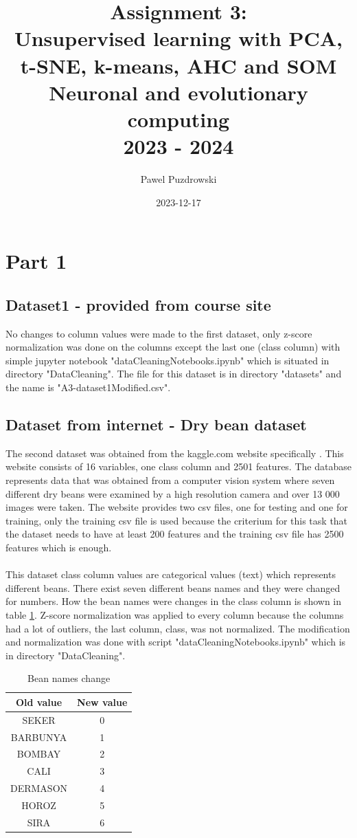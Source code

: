 \documentclass[12pt]{report}
\title{Assignment 3: \\ Unsupervised learning with
	PCA, t-SNE, k-means, AHC and SOM\\ Neuronal and evolutionary computing\\ 2023 - 2024}
\author{Pawel Puzdrowski}
\date{2023-12-17}
\begin{document}
	\maketitle
	\section*{Part 1}
	\subsection*{Dataset1 - provided from course site}
	No changes to column values were made to the first dataset, only z-score normalization was done on the columns except the last one (class column) with simple jupyter notebook "dataCleaningNotebooks.ipynb" which is situated in directory "DataCleaning". The file for this dataset is in directory "datasets" and the name is "A3-dataset1Modified.csv". 
	\subsection*{Dataset from internet - Dry bean dataset}
	The second dataset was obtained from the kaggle.com website specifically \cite{DatasetDryBeans}. This website consists of 16 variables, one class column and 2501 features. The database represents data that was obtained from a computer vision system where seven different dry beans were examined by a high resolution camera and over 13 000 images were taken. The website provides two csv files, one for testing and one for training, only the training csv file is used because the criterium for this task that the dataset needs to have at least 200 features and the training csv file has 2500 features which is enough. \\
	\\
	This dataset class column values are categorical values (text) which represents different beans. There exist seven different beans names and they were changed for numbers. How the bean names were changes in the class column is shown in table \ref{BeanClassChange}. Z-score normalization was applied to every column because the columns had a lot of outliers, the last column, class, was not normalized. The modification and normalization was done with script "dataCleaningNotebooks.ipynb" which is in directory "DataCleaning". 
	\begin{table}[H]
		\centering
		\begin{tabular}{|c|c|}
			\hline
			Old value & New value  \\
			\hline
			SEKER & 0 \\
			\hline
			BARBUNYA & 1 \\
			\hline
			BOMBAY & 2 \\
			\hline
			CALI & 3 \\
			\hline
			DERMASON & 4 \\
			\hline
			HOROZ & 5 \\
			\hline
			SIRA & 6 \\
			\hline
		\end{tabular}
		\caption{Bean names change}
		\label{BeanClassChange}
	\end{table}
	\newpage
\end{document}
